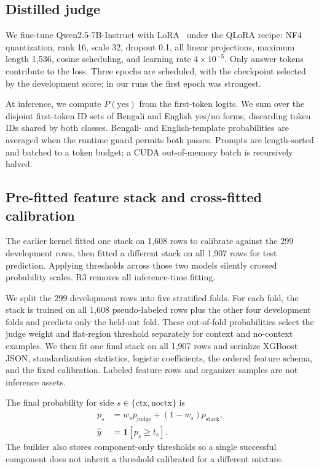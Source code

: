 \documentclass[11pt]{article}
\begin{document}
\subsection{Distilled judge}

We fine-tune Qwen2.5-7B-Instruct with LoRA~\citep{lora} under the QLoRA recipe:
NF4 quantization, rank 16, scale 32, dropout 0.1, all linear projections, maximum
length 1,536, cosine scheduling, and learning rate $4\times10^{-5}$. Only answer
tokens contribute to the loss. Three epochs are scheduled, with the checkpoint
selected by the development score; in our runs the first epoch was strongest.

At inference, we compute $P(\mathrm{yes})$ from the first-token logits. We sum over
the disjoint first-token ID sets of Bengali and English yes/no forms, discarding
token IDs shared by both classes. Bengali- and English-template probabilities are
averaged when the runtime guard permits both passes. Prompts are length-sorted and
batched to a token budget; a CUDA out-of-memory batch is recursively halved.

\subsection{Pre-fitted feature stack and cross-fitted calibration}

The earlier kernel fitted one stack on 1,608 rows to calibrate against the 299
development rows, then fitted a different stack on all 1,907 rows for test
prediction. Applying thresholds across those two models silently crossed probability
scales. R3 removes all inference-time fitting.

We split the 299 development rows into five stratified folds. For each fold, the
stack is trained on all 1,608 pseudo-labeled rows plus the other four development
folds and predicts only the held-out fold. These out-of-fold probabilities select
the judge weight and flat-region threshold separately for context and no-context
examples. We then fit one final stack on all 1,907 rows and serialize XGBoost JSON,
standardization statistics, logistic coefficients, the ordered feature schema, and
the fixed calibration. Labeled feature rows and organizer samples are not inference
assets.

The final probability for side $s\in\{\mathrm{ctx},\mathrm{noctx}\}$ is
\[
\begin{aligned}
p_s &= w_s p_{\mathrm{judge}} + (1-w_s)p_{\mathrm{stack}}, \\
\hat{y} &= \mathbf{1}[p_s\geq t_s].
\end{aligned}
\]
The builder also stores component-only thresholds so a single successful component
does not inherit a threshold calibrated for a different mixture.
\end{document}
